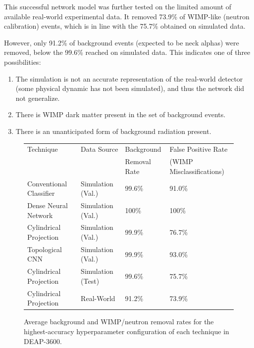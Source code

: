 \documentclass[12pt]{article}
\begin{document}
This successful network model was further tested on the limited amount of available real-world experimental data. It removed 73.9\% of WIMP-like (neutron calibration) events, which is in line with the 75.7\% obtained on simulated data.

However, only 91.2\% of background events (expected to be neck alphas) were removed, below the 99.6\% reached on simulated data. This indicates one of three possibilities:

\begin{enumerate}
    \item The simulation is not an accurate representation of the real-world detector (some physical dynamic has not been simulated), and thus the network did not generalize.
    \item There is WIMP dark matter present in the set of background events.
    \item There is an unanticipated form of background radiation present.
\end{enumerate}

\begin{figure}[ht]
    \centering
    \begin{tabular}[b]{|l|l|l|l|}
        \hline
        \rowcolor{lightcyan}
        Technique & Data Source & Background & False Positive Rate \\
        \rowcolor{lightcyan}
        & & Removal Rate & (WIMP Misclassifications) \\
        \hline
        Conventional Classifier & Simulation (Val.) & 99.6\% & 91.0\% \\
        \hline
        Dense Neural Network & Simulation (Val.) & 100\% & 100\% \\
        \hline
        Cylindrical Projection & Simulation (Val.) & 99.9\% & 76.7\% \\
        \hline
        Topological CNN & Simulation (Val.) & 99.9\% & 93.0\% \\
        \hline
        Cylindrical Projection & Simulation (Test) & 99.6\% & 75.7\% \\
        \hline
        Cylindrical Projection & Real-World & 91.2\% & 73.9\% \\
        \hline
    \end{tabular}
    \caption{\label{deap_final_results} Average background and WIMP/neutron removal rates for the highest-accuracy hyperparameter configuration of each technique in DEAP-3600.}
\end{figure}
\end{document}
